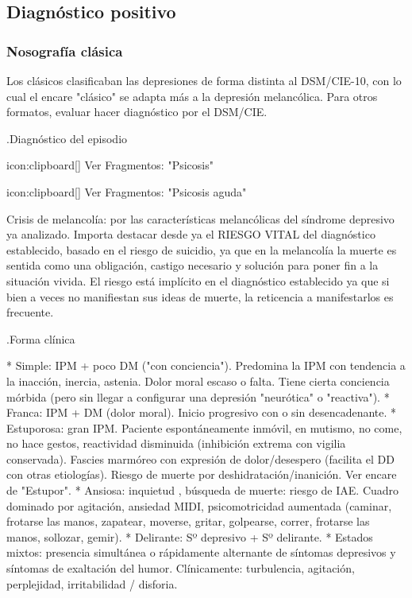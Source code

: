 \documentclass{scrbook}
\begin{document}
\subsection*{Diagnóstico positivo}
\subsubsection*{Nosografía clásica}
\faLightbulb Los clásicos clasificaban las depresiones de forma distinta al DSM/CIE-10, con lo cual el encare "clásico" se adapta más a la depresión melancólica. Para otros formatos, evaluar hacer diagnóstico por el DSM/CIE.

.Diagnóstico del episodio

icon:clipboard[] Ver Fragmentos: "Psicosis"

icon:clipboard[] Ver Fragmentos: "Psicosis aguda"

Crisis de melancolía: por las características melancólicas del síndrome depresivo ya analizado. Importa destacar desde ya el RIESGO VITAL del diagnóstico establecido, basado en el riesgo de suicidio, ya que en la melancolía la muerte es sentida como una obligación, castigo necesario y solución para poner fin a la situación vivida. El riesgo está implícito en el diagnóstico establecido ya que si bien a veces no manifiestan sus ideas de muerte, la reticencia a manifestarlos es frecuente.

.Forma clínica

* Simple: IPM + poco DM ("con conciencia"). Predomina la IPM con tendencia a la inacción, inercia, astenia. Dolor moral escaso o falta. Tiene cierta conciencia mórbida (pero sin llegar a configurar una depresión "neurótica" o "reactiva").
* Franca: IPM + DM (dolor moral). Inicio progresivo con o sin desencadenante.
* Estuporosa: gran IPM. Paciente espontáneamente inmóvil, en mutismo, no come, no hace gestos, reactividad disminuida (inhibición extrema con vigilia conservada). Fascies marmóreo con expresión de dolor/desespero (facilita el DD con otras etiologías). Riesgo de muerte por deshidratación/inanición. Ver encare de "Estupor".
* Ansiosa: inquietud , búsqueda de muerte: riesgo de IAE. Cuadro dominado por agitación, ansiedad MIDI, psicomotricidad aumentada (caminar, frotarse las manos, zapatear, moverse, gritar, golpearse, correr, frotarse las manos, sollozar, gemir).
* Delirante: Sº depresivo + Sº delirante.
* Estados mixtos: presencia simultánea o rápidamente alternante de síntomas depresivos y síntomas de exaltación del humor. Clínicamente: turbulencia, agitación, perplejidad, irritabilidad / disforia.
\end{document}
